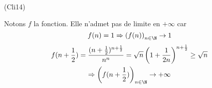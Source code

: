\begin{tiny}(Cli14)\end{tiny} Notons $f$ la fonction. Elle n'admet pas de limite en $+\infty$ car
\begin{displaymath}
  f(n) = 1 \Rightarrow \left( f(n)\right)_{n\in \N} \rightarrow 1 
\end{displaymath}
\begin{multline*}
  f(n+\frac{1}{2}) = \frac{(n+\frac{1}{2})^{n+\frac{1}{2}}}{n^n} = \sqrt{n}\left( 1+\frac{1}{2n}\right)^{n+\frac{1}{2}} \geq \sqrt{n}\\
  \Rightarrow \left( f(n+\frac{1}{2})\right)_{n\in \N} \rightarrow +\infty
\end{multline*}
